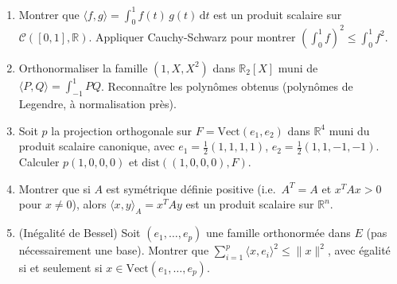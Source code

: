 \vspace{6pt}
\exolabel

\begin{mdframed}[style=exobar]
  \begin{enumerate}
    \item Montrer que $\langle f,g\rangle = \int_0^1 f(t)\,g(t)\,\mathrm{d}t$
          est un produit scalaire sur $\mathcal{C}([0,1],\mathbb{R})$.
          Appliquer Cauchy-Schwarz pour montrer
          $\left(\int_0^1 f\right)^2 \leq \int_0^1 f^2$.

    \item Orthonormaliser la famille $(1, X, X^2)$ dans $\mathbb{R}_2[X]$
          muni de $\langle P,Q\rangle = \int_{-1}^1 PQ$. Reconnaître les
          polynômes obtenus (polynômes de
          Legendre, à normalisation près).

    \item Soit $p$ la projection orthogonale sur $F = \mathrm{Vect}(e_1, e_2)$
          dans $\mathbb{R}^4$ muni du produit scalaire canonique, avec
          $e_1 = \frac{1}{2}(1,1,1,1)$, $e_2 = \frac{1}{2}(1,1,-1,-1)$.
          Calculer $p(1,0,0,0)$ et $\mathrm{dist}((1,0,0,0), F)$.

    \item Montrer que si $A$ est symétrique définie positive (i.e.\
          $A^T = A$ et $x^TAx > 0$ pour $x\neq 0$), alors
          $\langle x,y\rangle_A = x^T A y$ est un produit scalaire sur $\mathbb{R}^n$.

    \item (Inégalité de Bessel) Soit $(e_1,\ldots,e_p)$ une famille
          orthonormée dans $E$ (pas nécessairement une base).
          Montrer que $\sum_{i=1}^p \langle x,e_i\rangle^2 \leq \|x\|^2$,
          avec égalité si et seulement si $x \in \mathrm{Vect}(e_1,\ldots,e_p)$.
  \end{enumerate}
\end{mdframed}

